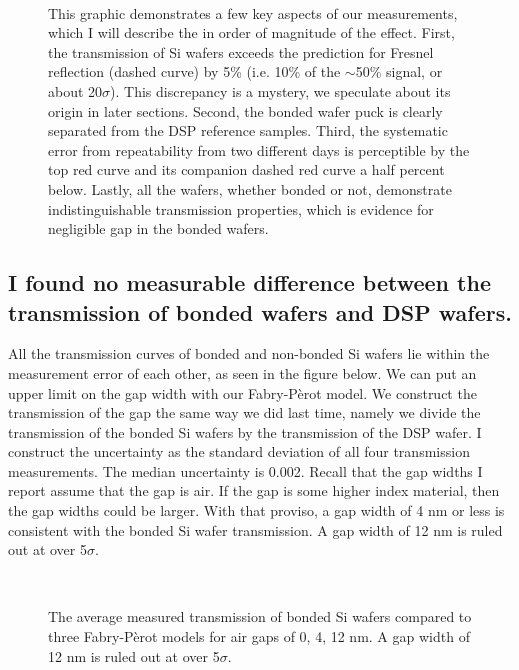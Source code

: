 \begin{figure}[h!] 
\begin{center}
\ 
\caption[Bonded Si wafer transmission]{This graphic demonstrates a few key aspects of our measurements, which I will describe the in order of magnitude of the effect.  First, the transmission of Si wafers exceeds the prediction for Fresnel reflection (dashed curve) by 5\% (i.e. 10\% of the $\sim$50\% signal, or about 20$\sigma$).  This discrepancy is a mystery, we speculate about its origin in later sections.  Second, the bonded wafer puck is clearly separated from the DSP reference samples.  Third, the systematic error from repeatability from two different days is perceptible by the top red curve and its companion dashed red curve a half percent below.  Lastly, all the wafers, whether bonded or not, demonstrate indistinguishable transmission properties, which is evidence for negligible gap in the bonded wafers.}
\label{fig:Cary5000wafer}
\end{center}
\end{figure}

\subsection{I found no measurable difference between the transmission of bonded wafers and DSP wafers.}

All the transmission curves of bonded and non-bonded Si wafers lie within the measurement error of each other, as seen in the figure below.  We can put an upper limit on the gap width with our Fabry-P\`{e}rot model.  We construct the transmission of the gap the same way we did last time, namely we divide the transmission of the bonded Si wafers by the transmission of the DSP wafer.  I construct the uncertainty as the standard deviation of all four transmission measurements.  The median uncertainty is 0.002.  Recall that the gap widths I report assume that the gap is air.  If the gap is some higher index material, then the gap widths could be larger.  With that proviso, a gap width of 4 nm or less is consistent with the bonded Si wafer transmission.  A gap width of 12 nm is ruled out at over 5$\sigma$.


\begin{figure}[h!] 
\begin{center}
\ 
\caption[Fabry-P\`{e}rot model shows $<4$ nm gaps in wafers]{The average measured transmission of bonded Si wafers compared to three Fabry-P\`{e}rot models for air gaps of 0, 4, 12 nm.  A gap width of 12 nm is ruled out at over 5$\sigma$.}
\label{fig:Wafers4nmGap}
\end{center}
\end{figure}


